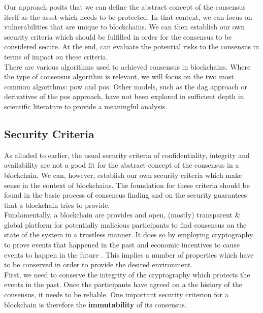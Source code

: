\documentclass[12pt,a4paper]{article}
\begin{document}
Our approach posits that we can define the abstract concept of the \gls{consensus} itself as the asset which needs to be protected. In that context, we can focus on vulnerabilities that are unique to \glspl{blockchain}. We can then establish our own security criteria which should be fulfilled in order for the \gls{consensus} to be considered secure. At the end, can evaluate the potential risks to the \gls{consensus} in terms of impact on these criteria.\\

There are various algorithms used to achieved consensus in \glspl{blockchain}. Where the type of consensus algorithm is relevant, we will focus on the two most common algorithms: \acrfull{pow} and \acrfull{pos}. Other models, such as the \acrfull{dag} approach or derivatives of the \acrshort{pos} approach, have not been explored in sufficient depth in scientific literature to provide a meaningful analysis.\\

\subsection{Security Criteria}

As alluded to earlier, the usual security criteria of confidentiality, integrity and availability are not a good fit for the abstract concept of the \gls{consensus} in a \gls{blockchain}. We can, however, establish our own security criteria which make sense in the context of \glspl{blockchain}. The foundation for these criteria should be found in the basic process of consensus finding and on the security guarantees that a \gls{blockchain} tries to provide.\\

Fundamentally, a \gls{blockchain} are provides and open, (mostly) transparent \& global platform for potentially malicious participants to find consensus on the state of the system in a trustless manner. It does so by employing cryptography to prove events that happened in the past and economic incentives to cause events to happen in the future \cite{crypto}. This implies a number of properties which have to be conserved in order to provide the desired environment.\\

First, we need to conserve the integrity of the cryptography which protects the events in the past. Once the participants have agreed on a the history of the \gls{consensus}, it needs to be reliable. One important security criterion for a \gls{blockchain} is therefore the \textbf{immutability} of its \gls{consensus}.\\
\end{document}
